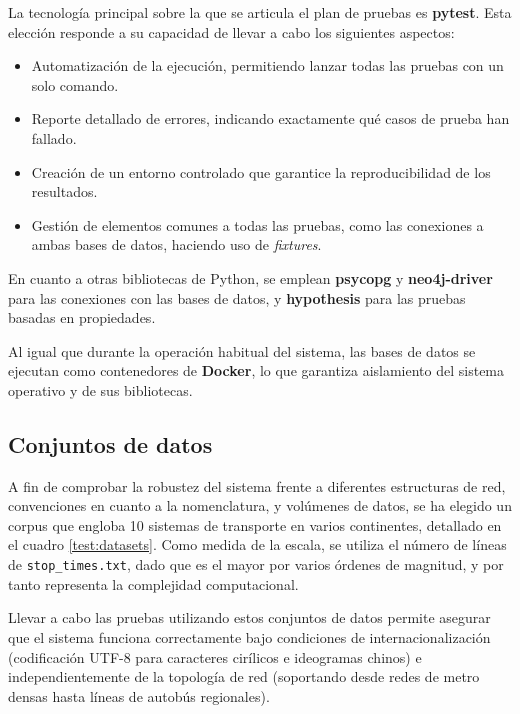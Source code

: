 La tecnología principal sobre la que se articula el plan de pruebas es \textbf{pytest}. Esta elección responde a su capacidad de llevar a cabo los siguientes aspectos:

\begin{itemize}
    \item Automatización de la ejecución, permitiendo lanzar todas las pruebas con un solo comando.
    \item Reporte detallado de errores, indicando exactamente qué casos de prueba han fallado.
    \item Creación de un entorno controlado que garantice la reproducibilidad de los resultados.
    \item Gestión de elementos comunes a todas las pruebas, como las conexiones a ambas bases de datos, haciendo uso de \textit{fixtures}.
\end{itemize}

En cuanto a otras bibliotecas de Python, se emplean \textbf{psycopg} y \textbf{neo4j-driver} para las conexiones con las bases de datos, y \textbf{hypothesis} para las pruebas basadas en propiedades.

Al igual que durante la operación habitual del sistema, las bases de datos se ejecutan como contenedores de \textbf{Docker}, lo que garantiza aislamiento del sistema operativo y de sus bibliotecas.

\subsection{Conjuntos de datos}

A fin de comprobar la robustez del sistema frente a diferentes estructuras de red, convenciones en cuanto a la nomenclatura, y volúmenes de datos, se ha elegido un corpus que engloba 10 sistemas de transporte en varios continentes, detallado en el cuadro \ref{test:datasets}. Como medida de la escala, se utiliza el número de líneas de \texttt{stop\_times.txt}, dado que es el mayor por varios órdenes de magnitud, y por tanto representa la complejidad computacional.

Llevar a cabo las pruebas utilizando estos conjuntos de datos permite asegurar que el sistema funciona correctamente bajo condiciones de internacionalización (codificación UTF-8 para caracteres cirílicos e ideogramas chinos) e independientemente de la topología de red (soportando desde redes de metro densas hasta líneas de autobús regionales).

